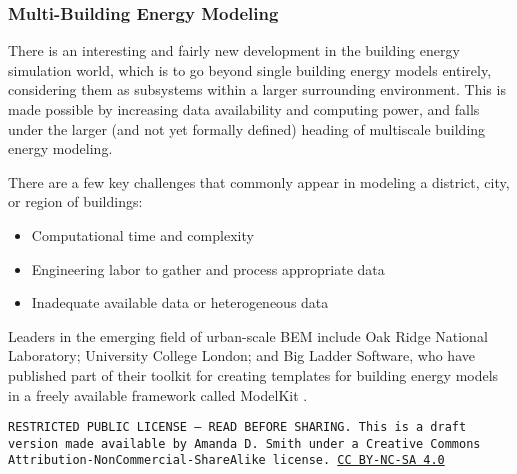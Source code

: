 \documentclass[10pt]{article}
\begin{document}
\subsubsection{Multi-Building Energy Modeling}


There is an interesting and fairly new development in the building energy simulation world, which is to go beyond single building energy models entirely, considering them as subsystems within a larger surrounding environment. This is made possible by increasing data availability and computing power, and falls under the larger (and not yet formally defined) heading of multiscale building energy modeling.

There are a few key challenges that commonly appear in modeling a district, city, or region of buildings:
\begin{itemize}
\item Computational time and complexity
\item Engineering labor to gather and process appropriate data
\item Inadequate available data or heterogeneous data
\end{itemize}

Leaders in the emerging field of urban-scale BEM include Oak Ridge National Laboratory;  University College London; and Big Ladder Software, who have published part of their toolkit for creating templates for building energy models in a freely available framework called ModelKit \cite{modelkit}. %

\bigskip

\noindent
\texttt{\footnotesize RESTRICTED PUBLIC LICENSE --- READ BEFORE SHARING. This is a draft version made available by Amanda D. Smith under a Creative Commons Attribution-NonCommercial-ShareAlike license. 
\href{https://creativecommons.org/licenses/by-nc-sa/4.0/}{CC BY-NC-SA 4.0}}

\newpage
\printbibliography
\end{document}

